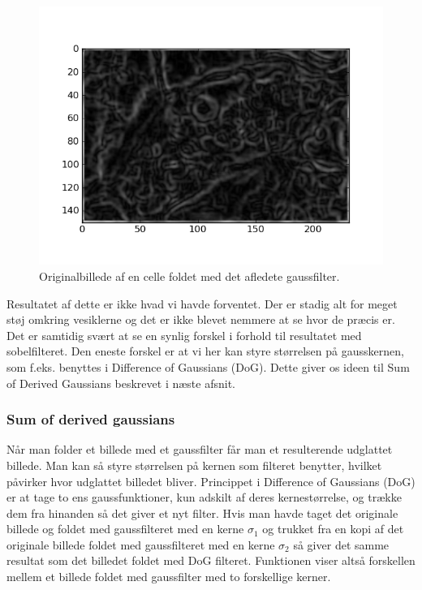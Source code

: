 \begin{figure}[H]
	\centering
	\includegraphics[scale=0.8]{files/premethod/img/gauss_derived_cell2.png}
	\caption{Originalbillede af en celle foldet med det afledete gaussfilter.\label{fig:premethod_gaussCell}}
\end{figure}

Resultatet af dette er ikke hvad vi havde forventet. Der er stadig alt for meget støj omkring vesiklerne og det er ikke blevet nemmere at se hvor de præcis er. Det er samtidig svært at se en synlig forskel i forhold til resultatet med sobelfilteret. Den eneste forskel er at vi her kan styre størrelsen på gausskernen, som f.eks. benyttes i Difference of Gaussians (DoG). Dette giver os ideen til Sum of Derived Gaussians beskrevet i næste afsnit.

\subsubsection{Sum of derived gaussians}
Når man folder et billede med et gaussfilter får man et resulterende udglattet billede. Man kan så styre størrelsen på kernen som filteret benytter, hvilket påvirker hvor udglattet billedet bliver. Princippet i Difference of Gaussians (DoG) er at tage to ens gaussfunktioner, kun adskilt af deres kernestørrelse, og trække dem fra hinanden så det giver et nyt filter. Hvis man havde taget det originale billede og foldet med gaussfilteret med en kerne $\sigma_1$ og trukket fra en kopi af det originale billede foldet med gaussfilteret med en kerne $\sigma_2$ så giver det samme resultat som det billedet foldet med DoG filteret. Funktionen viser altså forskellen mellem et billede foldet med gaussfilter med to forskellige kerner. 

